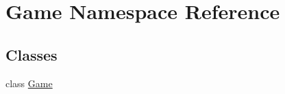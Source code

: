 \hypertarget{namespace_game}{}\section{Game Namespace Reference}
\label{namespace_game}
\subsection*{Classes}
\begin{DoxyCompactItemize}
\item 
class \hyperlink{class_game_1_1_game}{Game}
\end{DoxyCompactItemize}
